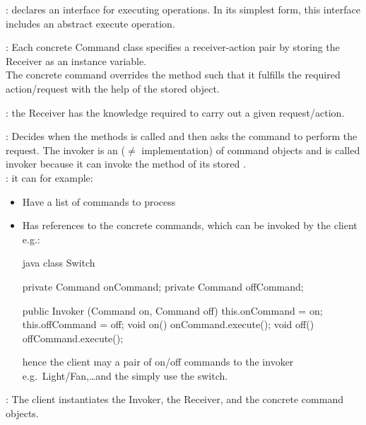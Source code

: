 \begin{partbox}[Participation]
  \begin{itemizenosep}
      \item {}: declares an interface for executing operations.
      In its simplest form, this interface includes an abstract execute operation. 
      \item {}: 
      Each concrete Command class specifies a receiver-action pair by storing
      the Receiver as an instance variable.\\
      The concrete command overrides the  method such that it fulfills
      the required action/request with the help of the stored
       object.
      \item {}: the Receiver has the knowledge required to carry out
      a given request/action.
        \item {}:
      Decides when the methods is called and then asks the command to perform
      the request.
      The invoker is an  ($\neq$
      implementation) of command objects and is called invoker
      because it can invoke the  method of its stored
      .\\
      : it can for example:
      \begin{itemize}
        \item Have a list of commands to process
                \begin{mintlinebox}{java}
            class Invoker{
              ArrayList<Command> l = new ArrayList<Command>();
              |\optldots|
              void invoke Command{
                for(Command c : l) {
                  // if resources available
                  c.execute();
                }
              }
          \end{mintlinebox}
        \item Has references to the concrete commands, which can be invoked by
        the client e.g.:
        \begin{mintlinebox}{java}
            class Switch{
              private Command onCommand;
              private Command offCommand;

              public Invoker (Command on, Command off){
                this.onCommand = on;
                this.offCommand = off;
              }  
              void on(){
                onCommand.execute();
              }
              void off(){
                offCommand.execute();
              }
            }
        \end{mintlinebox}
        hence the client may a pair of on/off commands to the invoker e.g.\
        Light/Fan,\ldots and the simply use the switch.
      \end{itemize}
      \item {}:
      The client instantiates the Invoker, the Receiver, and the concrete command objects.
  \end{itemizenosep}
\end{partbox}
